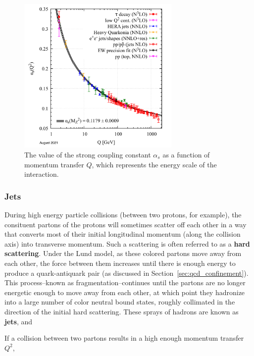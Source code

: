 \begin{figure}
    \centering
    \includegraphics[width=0.7\textwidth]{figures/introduction/running_coupling.png}
    \caption{The value of the strong coupling constant $\alpha_s$ as a function of momentum transfer $Q$, which represents the energy scale of the interaction.}
    \label{fig:asymptotic_freedom}
\end{figure}


\subsubsection{Jets}
\label{sec:jets}

During high energy particle collisions (between two protons, for example), the consituent partons of the protons will sometimes scatter off each other in a way that converts most of their initial longitudinal momentum (along the collision axis) into transverse momentum. Such a scattering is often referred to as a \textbf{hard scattering}. Under the Lund model, as these colored partons move away from each other, the force between them increases until there is enough energy to produce a quark-antiquark pair (as discussed in Section~\ref{sec:qcd_confinement}). This process--known as fragmentation--continues until the partons are no longer energetic enough to move away from each other, at which point they hadronize into a large number of color neutral bound states, roughly collimated in the direction of the initial hard scattering. These sprays of hadrons are known as \textbf{jets}, and 

If a collision between two partons results in a high enough momentum transfer $Q^2$, 